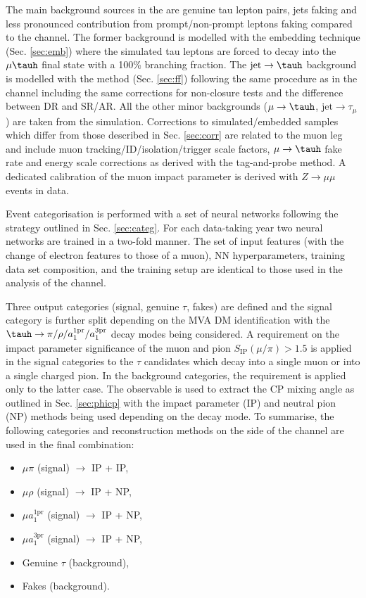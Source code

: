 The main background sources in the \mt are genuine tau lepton pairs, jets faking \tauh and less pronounced contribution from prompt/non-prompt leptons faking \tauh compared to the \et channel. The former background is modelled with the embedding technique (Sec. \ref{sec:emb}) where the simulated tau leptons are forced to decay into the $\mu\tauh$ final state with a 100\% branching fraction. The $\text{jet} \to \tauh$ background is modelled with the \ff method (Sec. \ref{sec:ff}) following the same procedure as in the \et channel including the same corrections for non-closure tests and the difference between DR and SR/AR. All the other minor backgrounds ($\mu \to \tauh$, $\text{jet} \to \tau_\mu$) are taken from the simulation. Corrections to simulated/embedded samples which differ from those described in Sec. \ref{sec:corr} are related to the muon leg and include muon tracking/ID/isolation/trigger scale factors, $\mu \to \tauh$ fake rate and energy scale corrections as derived with the tag-and-probe method. A dedicated calibration of the muon impact parameter is derived with $Z\to\mu\mu$ events in data.

Event categorisation is performed with a set of neural networks following the strategy outlined in Sec. \ref{sec:categ}. For each data-taking year two neural networks are trained in a two-fold manner. The set of input features (with the change of electron features to those of a muon), NN hyperparameters, training data set composition, and the training setup are identical to those used in the analysis of the \et channel. 

Three output categories (signal, genuine $\tau$, fakes) are defined and the signal category is further split depending on the \tauh MVA DM identification with the $\tauh \to \pi/\rho/a_1^\text{1pr}/a_1^\text{3pr}$ decay modes being considered. A requirement on the impact parameter significance of the muon and pion $S_\text{IP} (\mu/\pi) > 1.5$ is applied in the signal categories to the $\tau$ candidates which decay into a single muon or into a single charged pion. In the background categories, the requirement is applied only to the latter case. The \phicp observable is used to extract the CP mixing angle \mixa as outlined in Sec. \ref{sec:phicp} with the impact parameter (IP) and neutral pion (NP) methods being used depending on the \tauh decay mode. To summarise, the following categories and \phicp reconstruction methods on the side of the \mt channel are used in the final combination:  

\begin{itemize}
    \item $\mu\pi$ (signal) $\longrightarrow$ IP + IP,
    \item $\mu\rho$ (signal) $\longrightarrow$ IP + NP,
    \item $\mu a_1^\text{1pr}$ (signal) $\longrightarrow$ IP + NP,
    \item $\mu a_1^\text{3pr}$ (signal) $\longrightarrow$ IP + NP,
    \item Genuine $\tau$ (background),
    \item Fakes (background).
\end{itemize}

